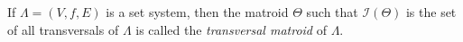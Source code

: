 If $\Lambda = (V, f, E)$ is a set system, then the matroid $\Theta$ such that $\mathcal{I}(\Theta)$ is the set of all transversals of $\Lambda$ is called the \textit{transversal matroid} of $\Lambda$.
